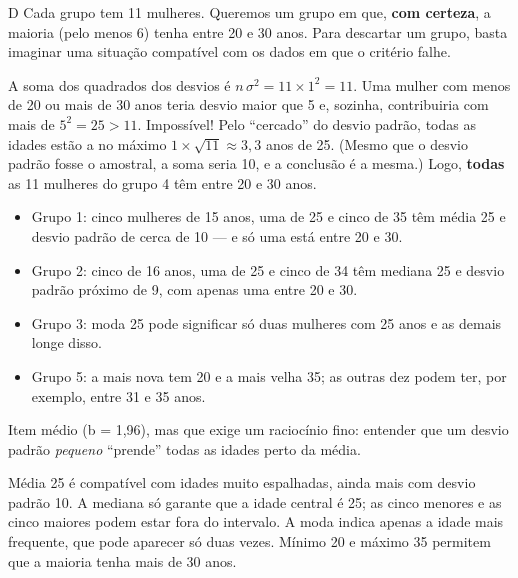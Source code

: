 \begin{resolucao}{D}
 Cada grupo tem 11 mulheres. Queremos um grupo em que,
\textbf{com certeza}, a maioria (pelo menos 6) tenha entre 20 e 30 anos. Para descartar um grupo, basta
imaginar uma situação compatível com os dados em que o critério falhe.

 A soma dos quadrados dos desvios é
$n\,\sigma^2 = 11 \times 1^2 = 11$. Uma mulher com menos de 20 ou mais de 30 anos teria desvio maior
que 5 e, sozinha, contribuiria com mais de $5^2 = 25 > 11$. Impossível! Pelo “cercado” do desvio
padrão, todas as idades estão a no máximo $1 \times \sqrt{11} \approx 3{,}3$ anos de 25. (Mesmo que o
desvio padrão fosse o amostral, a soma seria 10, e a conclusão é a mesma.) Logo,
\textbf{todas} as 11 mulheres do grupo 4 têm entre 20 e 30 anos.

\begin{itemize}[nosep,leftmargin=1.2em]
  \item Grupo 1: cinco mulheres de 15 anos, uma de 25 e cinco de 35 têm média 25 e desvio padrão de
  cerca de 10 — e só uma está entre 20 e 30.
  \item Grupo 2: cinco de 16 anos, uma de 25 e cinco de 34 têm mediana 25 e desvio padrão próximo de 9,
  com apenas uma entre 20 e 30.
  \item Grupo 3: moda 25 pode significar só duas mulheres com 25 anos e as demais longe disso.
  \item Grupo 5: a mais nova tem 20 e a mais velha 35; as outras dez podem ter, por exemplo, entre 31 e
  35 anos.
\end{itemize}


Item médio (b = 1,96), mas que exige um raciocínio fino: entender que um desvio padrão
\emph{pequeno} “prende” todas as idades perto da média.

\begin{distratores}
 Média 25 é compatível com idades muito espalhadas, ainda mais com desvio padrão 10.
 A mediana só garante que a idade central é 25; as cinco menores e as cinco maiores podem estar
fora do intervalo.
 A moda indica apenas a idade mais frequente, que pode aparecer só duas vezes.
 Mínimo 20 e máximo 35 permitem que a maioria tenha mais de 30 anos.
\end{distratores}
\end{resolucao}

